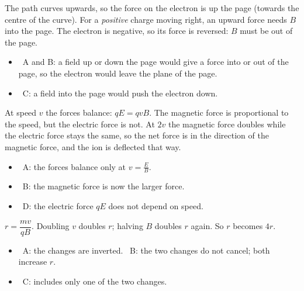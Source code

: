 \documentclass[12pt]{article}
\begin{document}
\begin{practiceanswers}
\begin{practiceans}
  The path curves upwards, so the force on the electron is up the page (towards the centre of the
  curve). For a \emph{positive} charge moving right, an upward force needs $B$ into the page. The
  electron is negative, so its force is reversed: $B$ must be out of the page.
  \begin{itemize}
    \item \xmark\ A and B: a field up or down the page would give a force into or out of the page, so
          the electron would leave the plane of the page.
    \item \xmark\ C: a field into the page would push the electron down.
  \end{itemize}
\end{practiceans}

\begin{practiceans}
  At speed $v$ the forces balance: $qE = qvB$. The magnetic force is proportional to the speed, but the
  electric force is not. At $2v$ the magnetic force doubles while the electric force stays the same, so
  the net force is in the direction of the magnetic force, and the ion is deflected that way.
  \begin{itemize}
    \item \xmark\ A: the forces balance only at $v = \frac{E}{B}$.
    \item \xmark\ B: the magnetic force is now the larger force.
    \item \xmark\ D: the electric force $qE$ does not depend on speed.
  \end{itemize}
\end{practiceans}

\begin{practiceans}
  $r = \dfrac{mv}{qB}$. Doubling $v$ doubles $r$; halving $B$ doubles $r$ again. So $r$ becomes $4r$.
  \begin{itemize}
    \item \xmark\ A: the changes are inverted. \quad \xmark\ B: the two changes do not cancel; both
          increase $r$.
    \item \xmark\ C: includes only one of the two changes.
  \end{itemize}
\end{practiceans}


\end{practiceanswers}
\end{document}
